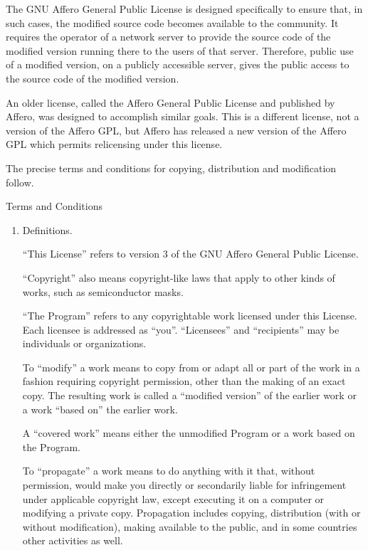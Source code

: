 \documentclass[10pt,a4paper,ngerman,titlepage,tocindentauto]{article}
\begin{document}
\begin{multicols}{3}
{					The GNU Affero General Public License is designed specifically to
					ensure that, in such cases, the modified source code becomes available
					to the community.  It requires the operator of a network server to
					provide the source code of the modified version running there to the
					users of that server.  Therefore, public use of a modified version, on
					a publicly accessible server, gives the public access to the source
					code of the modified version.

					An older license, called the Affero General Public License and
					published by Affero, was designed to accomplish similar goals.  This is
					a different license, not a version of the Affero GPL, but Affero has
					released a new version of the Affero GPL which permits relicensing under
					this license.

					The precise terms and conditions for copying, distribution and
					modification follow.

					\begin{center}
					{\sc Terms and Conditions}
					\end{center}

					\begin{enumerate}

					\addtocounter{enumi}{-1}

					\item Definitions.

					``This License'' refers to version 3 of the GNU Affero General Public License.

					``Copyright'' also means copyright-like laws that apply to other kinds of
					works, such as semiconductor masks.

					``The Program'' refers to any copyrightable work licensed under this
					License.  Each licensee is addressed as ``you''.  ``Licensees'' and
					``recipients'' may be individuals or organizations.

					To ``modify'' a work means to copy from or adapt all or part of the work
					in a fashion requiring copyright permission, other than the making of an
					exact copy.  The resulting work is called a ``modified version'' of the
					earlier work or a work ``based on'' the earlier work.

					A ``covered work'' means either the unmodified Program or a work based
					on the Program.

					To ``propagate'' a work means to do anything with it that, without
					permission, would make you directly or secondarily liable for
					infringement under applicable copyright law, except executing it on a
					computer or modifying a private copy.  Propagation includes copying,
					distribution (with or without modification), making available to the
					public, and in some countries other activities as well.


\end{enumerate}}
\end{multicols}
\end{document}
